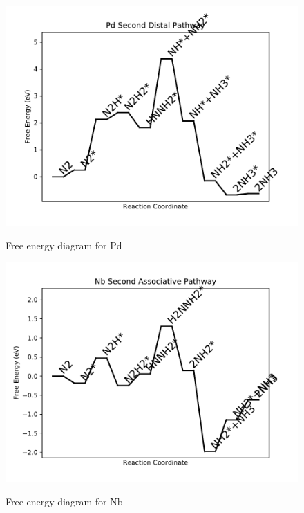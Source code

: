 \documentclass{article}
\begin{document}
\begin{figure}
\includegraphics[width=1\linewidth]{data/plots/Pd_distal_2.pdf}
\label{fig:Pd_distal_2}
\caption{Free energy diagram for Pd}
\end{figure}

\begin{figure}
\includegraphics[width=1\linewidth]{data/plots/Nb_associative_2.pdf}
\label{fig:Nb_associative_2}
\caption{Free energy diagram for Nb}
\end{figure}
\end{document}
